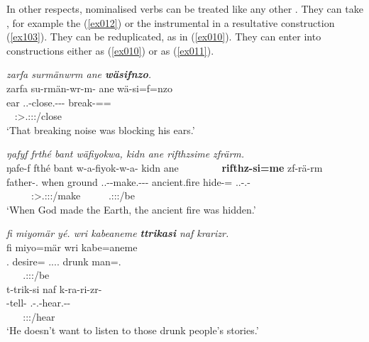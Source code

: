 In other respects, nominalised verbs can be treated like any other . They can take , for example the  (\ref{ex012}) or the instrumental in a resultative construction (\ref{ex103}). They can be reduplicated, as in (\ref{ex010}). They can enter into  constructions either as  (\ref{ex010}) or as  (\ref{ex011}).

\begin{exe}
	\ex \textit{zarfa surmänwrm ane \textbf{wäsifnzo}.}\\
	\glll zarfa su-rmän-wr-m-\Zero{} ane wä-si=f=nzo\\
	ear \Tsg.\Masc.\Betatwo-close.\Ext-\Ndu-\Dur-\Stnsg{} {\Dem} break-{\Nmlz}={\Erg}={\Only}\\
	~ {\footnotesize \Stsg:\Sbj>\Tsg.\Masc:\Obj:\Pst:\Dur/close} ~ ~\\
	\trans `That breaking noise was blocking his ears.' 
	\label{ex012}
\end{exe}
\begin{exe}
	\ex \emph{ŋafyf frthé bant wäfiyokwa, kidn ane rifthzsime zfrärm.}\\
	\glll ŋafe-f fthé bant w-a-fiyok-w-a-\Zero{} kidn ane~~~~~~~~  \textbf{rifthz-si=me} zf-rä-rm\\
	father-\Erg.{\Sg} when ground \Tsg.\F.\Alph-\Vc-make.\Ext-\Ndu-\Pst-\Stsg{} ancient.fire {\Dem} hide-{\Nmlz}={\Ins} \Tsg.\F.\Betatwo-\Cop.\Ndu-\Dur\\
	~ ~ ~ {\footnotesize \Stsg:\Sbj>\Tsg.\F:\Obj:\Pst:\Ipfv/make} ~ ~ ~ {\footnotesize \Tsg.\F:\Sbj:\Pst:\Dur/be}\\
	\trans `When God made the Earth, the ancient fire was hidden.'
	\label{ex103}
\end{exe}
\begin{exe}
	\ex \textit{fi miyomär yé. wri kabeaneme \textbf{ttrikasi} naf krarizr.}\\
	\glll fi miyo=mär  wri kabe=aneme\\
	\Third.{\Abs} desire={\Priv} \Tsg.\Masc.\Alph.\Cop.{\Ndu} drunk man={\Poss}.{\Nsg}\\
	~ ~ {\footnotesize \Tsg.\Masc:\Sbj:\Nonpast:\Ipfv/be} ~ ~\\
	\sn
	\glll t-trik-si naf k-ra-ri-zr-\Zero{}\\
	\Redup-tell-{\Nmlz} \Tsg{\Erg} \M.\Bet-\Irr.\Vc-hear.\Ext-\Ndu-\Stsg{}\\
	~ ~ {\footnotesize \Stsg:\Sbj:\Irr:\Ipfv/hear}\\
	\trans `He doesn't want to listen to those drunk people's stories.'
	\label{ex010}
\end{exe}
